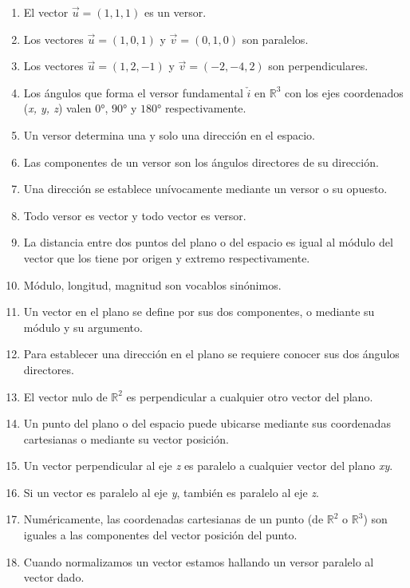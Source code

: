 \documentclass[11pt,a4paper]{article}
\begin{document}
\begin{enumerate}
\begin{enumerate}[1)]
\setcounter{enumi}{0} %

\item El vector $\vec{u} = (1, 1, 1)$ es un versor.
\item Los vectores $\vec{u} = (1, 0, 1)$ y $\vec{v} = (0, 1, 0)$ son paralelos.
\item Los vectores $\vec{u} = (1, 2,-1)$ y $\vec{v} = (-2, -4, 2)$ son perpendiculares.
\item Los \'angulos que forma el versor fundamental $\check{i}$ en $\mathbb{R}^{3}$ con los ejes coordenados (\textit{x, y, z}) valen $\ang{0}$, $\ang{90}$ y $\ang{180}$ respectivamente.
\item Un versor determina una y solo una direcci\'on en el espacio.
\item Las componentes de un versor son los \'angulos directores de su direcci\'on.
\item Una direcci\'on se establece un\'ivocamente mediante un versor o su opuesto.
\item Todo versor es vector y todo vector es versor.
\item La distancia entre dos puntos del plano o del espacio es igual al m\'odulo del vector que los tiene
por origen y extremo respectivamente.
\item M\'odulo, longitud, magnitud son vocablos sin\'onimos.
\item Un vector en el plano se define por sus dos componentes, o mediante su m\'odulo y su argumento.
\item Para establecer una direcci\'on en el plano se requiere conocer sus dos \'angulos directores.
\item El vector nulo de $\mathbb{R}^{2}$ es perpendicular a cualquier otro vector del plano.
\item Un punto del plano o del espacio puede ubicarse mediante sus coordenadas cartesianas o
mediante su vector posici\'on.
\item Un vector perpendicular al eje \textit{z} es paralelo a cualquier vector del plano \textit{xy}.
\item Si un vector es paralelo al eje \textit{y}, tambi\'en es paralelo al eje \textit{z}.
\item Num\'ericamente, las coordenadas cartesianas de un punto (de $\mathbb{R}^{2}$ o $\mathbb{R}^{3}$) son iguales a las
componentes del vector posici\'on del punto.
\item Cuando normalizamos un vector estamos hallando un versor paralelo al vector dado.

\end{enumerate}
\end{enumerate}
\end{document}
